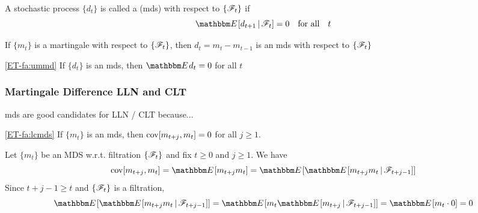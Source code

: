 \begin{frame}
    
    \vspace{2em}
    A stochastic process $\{d_t\}$ is called a  ({\sc mds}) with respect
    to $\{\mathscr F_t\}$ if 
    \begin{equation*}
        \EE [ d_{t+1} \given \fF_t] = 0 \quad \text{for all} \quad t
    \end{equation*}
    
    \vspace{1em}
    If $\{m_t\}$ is a
    martingale with respect to $\{\mathscr F_t\}$, then $d_t = m_t - m_{t-1}$ is an
    {\sc mds} with respect to $\{\mathscr F_t\}$
    
    \vspace{1em}
    \Fact\textcolor{Brown}{\eqref{ET-fa:ummd}}
        If $\{d_t\}$ is an {\sc mds}, then $\EE d_t=0$ for all $t$
        
\end{frame}

\begin{frame}\frametitle{Martingale Difference LLN and CLT}

    \vspace{2em}
    {\sc mds} are good candidates for LLN / CLT
    because...
    
    \vspace{1em}
    \Fact\textcolor{Brown}{\eqref{ET-fa:lcmds}}
        If $\{m_t\}$ is an {\sc mds}, then $\operatorname{cov}[m_{t+j}, m_t] = 0$ for all $j \geq 1$.
    
    \Prf Let $\{m_t\}$ be an MDS w.r.t. filtration $\{\mathscr F_t\}$ and fix $t \geq 0$ and $j \geq 1$. We have
    \begin{equation*}
        \cov[m_{t+j}, m_t] 
        = \EE[m_{t+j} m_t] 
        = \EE[ \EE[ m_{t+j} m_t \given \fF_{t+j-1}]] 
    \end{equation*}
    Since $t + j - 1 \geq t$ and $\{\mathscr F_t\}$ is a filtration,
    \begin{equation*}
        \EE[ \EE[ m_{t+j} m_t \given \fF_{t+j-1}]]  
        = \EE[ m_t \EE[ m_{t+j} \given \fF_{t+j-1}]] 
        = \EE[ m_t \cdot 0 ]
        = 0
    \end{equation*}
\end{frame}


